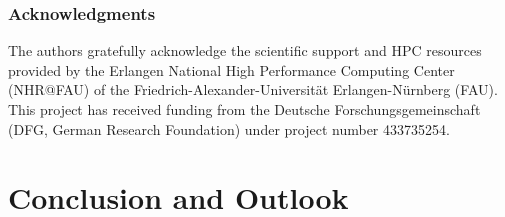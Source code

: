 \documentclass[preprint,12pt]{elsarticle}
\begin{document}
\subsubsection*{Acknowledgments}

The authors gratefully acknowledge the scientific support and HPC resources provided by the Erlangen National High Performance Computing Center (NHR@FAU) of the Friedrich-Alexander-Universität Erlangen-Nürnberg (FAU).
This project has received funding from the Deutsche Forschungsgemeinschaft (DFG, German Research Foundation) under project number 433735254.

\section{Conclusion and Outlook}
\label{sec:conclusion}





 






\end{document}
